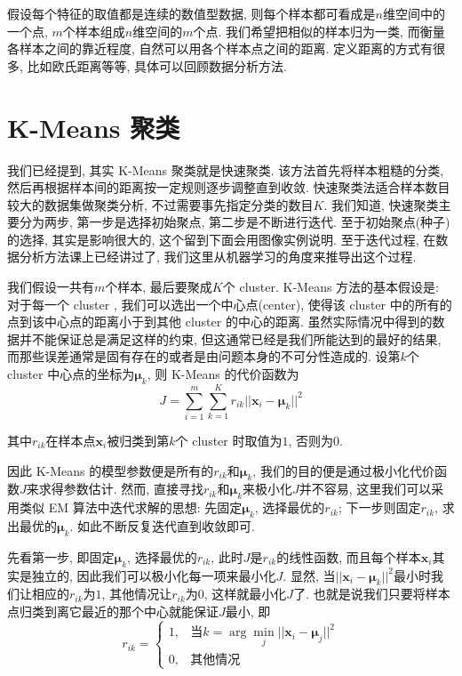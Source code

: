 \documentclass[a4paper,UTF8]{ctexart}
\theoremstyle{plain} \newtheorem{theorem}{定理}[section]
\theoremstyle{plain} \newtheorem{definition}{定义}[section]
\theoremstyle{plain} \newtheorem{lemma}{引理}[section]
\theoremstyle{plain} \newtheorem{proposition}{命题}[section]
\theoremstyle{plain} \newtheorem{example}{例}[section]
\theoremstyle{plain} \newtheorem{remark}{注}[section]
\theoremstyle{plain} \newtheorem{corollary}{推论}[section]
\begin{document}
假设每个特征的取值都是连续的数值型数据, 则每个样本都可看成是$n$维空间中的一个点, $m$个样本组成$n$维空间的$m$个点. 我们希望把相似的样本归为一类, 而衡量各样本之间的靠近程度, 自然可以用各个样本点之间的距离. 定义距离的方式有很多, 比如欧氏距离等等, 具体可以回顾数据分析方法.


\section{K-Means 聚类}
我们已经提到, 其实 K-Means 聚类就是快速聚类. 该方法首先将样本粗糙的分类, 然后再根据样本间的距离按一定规则逐步调整直到收敛. 快速聚类法适合样本数目较大的数据集做聚类分析, 不过需要事先指定分类的数目$K$. 我们知道, 快速聚类主要分为两步, 第一步是选择初始聚点, 第二步是不断进行迭代. 至于初始聚点(种子)的选择, 其实是影响很大的, 这个留到下面会用图像实例说明. 至于迭代过程, 在数据分析方法课上已经讲过了, 我们这里从机器学习的角度来推导出这个过程.

我们假设一共有$m$个样本, 最后要聚成$K$个 cluster. K-Means 方法的基本假设是: 对于每一个 cluster , 我们可以选出一个中心点(center), 使得该 cluster 中的所有的点到该中心点的距离小于到其他 cluster 的中心的距离. 虽然实际情况中得到的数据并不能保证总是满足这样的约束, 但这通常已经是我们所能达到的最好的结果, 而那些误差通常是固有存在的或者是由问题本身的不可分性造成的. 设第$k$个 cluster 中心点的坐标为$\bm{\mu}_{k}$, 则 K-Means 的代价函数为
\begin{equation*}
J = \sum_{i = 1}^{m} \sum_{k = 1}^{K} r_{ik} ||\bm{x}_{i} - \bm{\mu}_{k}||^2
\end{equation*}

其中$r_{ik}$在样本点$\bm{x}_{i}$被归类到第$k$个 cluster 时取值为$1$, 否则为$0$. 

因此 K-Means 的模型参数便是所有的$r_{ik}$和$\bm{\mu}_{k}$, 我们的目的便是通过极小化代价函数$J$来求得参数估计. 然而, 直接寻找$r_{ik}$和$\bm{\mu}_{k}$来极小化$J$并不容易, 这里我们可以采用类似 EM 算法中迭代求解的思想: 先固定$\bm{\mu}_{k}$, 选择最优的$r_{ik}$; 下一步则固定$r_{ik}$, 求出最优的$\bm{\mu}_{k}$. 如此不断反复迭代直到收敛即可.

先看第一步, 即固定$\bm{\mu}_{k}$, 选择最优的$r_{ik}$, 此时$J$是$r_{ik}$的线性函数, 而且每个样本$\bm{x}_{i}$其实是独立的, 因此我们可以极小化每一项来最小化$J$. 显然, 当$||\bm{x}_{i} - \bm{\mu}_{k}||^2$最小时我们让相应的$r_{ik}$为$1$, 其他情况让$r_{ik}$为$0$, 这样就最小化$J$了. 也就是说我们只要将样本点归类到离它最近的那个中心就能保证$J$最小, 即
$$
r_{ik} = 
\begin{cases}
1, & \textrm{当} k = \arg \min_{j} ||\bm{x}_{i} - \bm{\mu}_j||^2 \\ 
0, & \textrm{其他情况}
\end{cases}
$$
\end{document}
